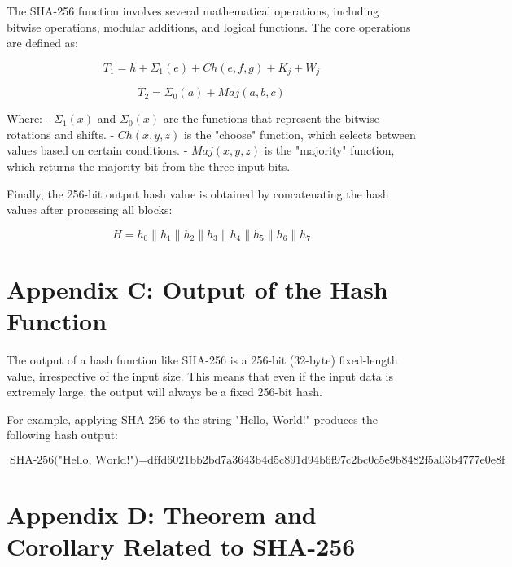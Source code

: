 The SHA-256 function involves several mathematical operations, including bitwise operations, modular additions, and logical functions. The core operations are defined as:

\[
T_1 = h + \Sigma_1(e) + Ch(e,f,g) + K_j + W_j
\]

\[
T_2 = \Sigma_0(a) + Maj(a,b,c)
\]

Where:
- \( \Sigma_1(x) \) and \( \Sigma_0(x) \) are the functions that represent the bitwise rotations and shifts.
- \( Ch(x, y, z) \) is the "choose" function, which selects between values based on certain conditions.
- \( Maj(x, y, z) \) is the "majority" function, which returns the majority bit from the three input bits.

Finally, the 256-bit output hash value is obtained by concatenating the hash values after processing all blocks:

\[
H = h_0 \parallel h_1 \parallel h_2 \parallel h_3 \parallel h_4 \parallel h_5 \parallel h_6 \parallel h_7
\]

\clearpage
\fancyhead[]{}
\fancyhead[LE,RO]{\thepage}
\section*{\centering Appendix C: Output of the Hash Function}

The output of a hash function like SHA-256 is a 256-bit (32-byte) fixed-length value, irrespective of the input size. This means that even if the input data is extremely large, the output will always be a fixed 256-bit hash.

For example, applying SHA-256 to the string "Hello, World!" produces the following hash output:

\[
\text{SHA-256("Hello, World!")} = \text{dffd6021bb2bd7a3643b4d5c891d94b6f97c2bc0c5e9b8482f5a03b4777e0e8f}
\]
\clearpage




\newtheorem{theorem}{Theorem}[section] 
\newtheorem{corollary}[theorem]{Corollary}  

\clearpage
\fancyhead[]{}
\fancyhead[LE,RO]{\thepage}
\section*{\centering Appendix D: Theorem and Corollary Related to SHA-256}


